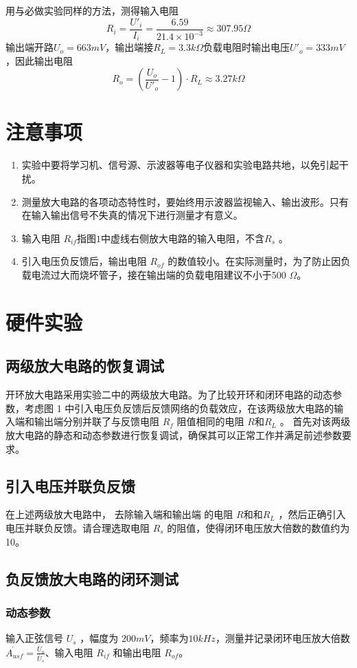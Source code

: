 \documentclass[12pt,a4paper]{article}
\begin{document}
\begin{spacing}{1.3}
\begin{figure}[H]
\end{figure}
用与必做实验同样的方法，测得输入电阻
\[
R_i = \frac{U'_i}{I_i} = \frac{6.59}{21.4 \times 10^{-3}} \approx 307.95\Omega
\]
输出端开路$U_o = 663mV$，输出端接$R_L=3.3k\Omega$负载电阻时输出电压$U'_o = 333mV$，因此输出电阻
\[
R_o = (\frac{U_o}{U'_o}-1)\cdot R_L \approx 3.27k\Omega
\]
\section{注意事项}
\begin{enumerate}
\item 实验中要将学习机、信号源、示波器等电子仪器和实验电路共地，以免引起干扰。
\item 测量放大电路的各项动态特性时，要始终用示波器监视输入、输出波形。只有在输入输出信号不失真的情况下进行测量才有意义。
\item 输入电阻 $R_{if} 指图 1 中虚线右侧放大电路的输入电阻，不含 R_s$ 。
\item 引入电压负反馈后，输出电阻 $R_{of}$ 的数值较小。在实际测量时，为了防止因负载电流过大而烧坏管子，接在输出端的负载电阻建议不小于500 $\Omega$。
\end{enumerate}
\section{硬件实验}
\subsection{两级放大电路的恢复调试}
开环放大电路采用实验二中的两级放大电路。为了比较开环和闭环电路的动态参数，考虑图 1 中引入电压负反馈后反馈网络的负载效应，在该两级放大电路的输入端和输出端分别并联了与反馈电阻 $R_f$ 阻值相同的电阻 $R 和 R_L$ 。
首先对该两级放大电路的静态和动态参数进行恢复调试，确保其可以正常工作并满足前述参数要求。
\subsection{引入电压并联负反馈}
在上述两级放大电路中， 去除输入端和输出端 的电阻 $R 和 和 R_L$ ，然后正确引入电压并联负反馈。请合理选取电阻 $R_s$ 的阻值，使得闭环电压放大倍数的数值约为 10。

\subsection{负反馈放大电路的闭环测试}
\subsubsection{动态参数}
输入正弦信号 $U_s$ ，幅度为 $200mV，频率为 10kHz$，测量并记录闭环电压放大倍数$\dot{A_{usf}}=\frac{\dot{U_o}}{\dot{U_s}}$、输入电阻 $R_{if}$ 和输出电阻 $R_{of}$。\\

\end{spacing}
\end{document}
